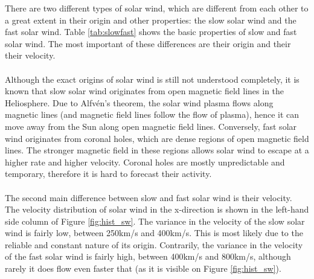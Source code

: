 \documentclass[11pt]{article}
\begin{document}
        There are two different types of solar wind, which are different from each other to a great extent in their origin and other properties: the slow solar wind and the fast solar wind. Table \ref{tab:slowfast} shows the basic properties of slow and fast solar wind. The most important of these differences are their origin and their their velocity.\\ \\
        Although the exact origins of solar wind is still not understood completely, it is known that slow solar wind originates from open magnetic field lines in the Heliosphere. Due to Alfvén's theorem\cite{1976alfven}, the solar wind plasma flows along magnetic lines (and magnetic field lines follow the flow of plasma), hence it can move away from the Sun along open magnetic field lines. Conversely, fast solar wind originates from coronal holes, which are dense regions of open magnetic field lines. The stronger magnetic field in these regions allows solar wind to escape at a higher rate and higher velocity. Coronal holes are mostly unpredictable and temporary, therefore it is hard to forecast their activity.\\ \\
        The second main difference between slow and fast solar wind is their velocity. The velocity distribution of solar wind in the x-direction is shown in the left-hand side column of Figure \ref{fig:hist_sw}. The variance in the velocity of the slow solar wind is fairly low, between 250km/s and 400km/s. This is most likely due to the reliable and constant nature of its origin. Contrarily, the variance in the velocity of the fast solar wind is fairly high, between 400km/s and 800km/s, although rarely it does flow even faster that (as it is visible on Figure \ref{fig:hist_sw}).\\
\end{document}
